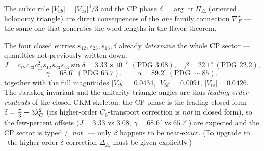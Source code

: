 \noindent The cubic rule $|V_{ub}|=|V_{us}|^3/3$ and the CP phase $\delta=\arg\operatorname{tr}\Pi_\triangle$
(oriented holonomy triangle) are direct consequences of the \emph{one} family connection
$\nabla_F^\star$ --- the same one that generates the word-lengths in the flavor theorem.

\begin{winbox}
The four closed entries $s_{12},s_{23},s_{13},\delta$ already \emph{determine} the whole CP sector ---
quantities not previously written down:
\[
  J=c_{12}c_{23}c_{13}^2 s_{12}s_{23}s_{13}\sin\delta=3.33\times10^{-5}\ (\text{PDG }3.08),\quad
  \beta=22.1^\circ\ (\text{PDG }22.2),
\]
\[
  \gamma=68.6^\circ\ (\text{PDG }65.7),\qquad \alpha=89.2^\circ\ (\text{PDG }\sim85),
\]
together with the full magnitudes $|V_{cb}|=0.0434$, $|V_{td}|=0.0091$, $|V_{ts}|=0.0426$. The Jarlskog
invariant and the unitarity-triangle angles are thus \emph{leading-order readouts} of the closed CKM
skeleton: the CP phase is the leading closed form $\delta=\tfrac\pi3+3\lambda_C^2$ (its higher-order $C_6$-transport
correction is \emph{not} in closed form), so the few-percent offsets ($J{=}3.33$ vs $3.08$, $\gamma{=}68.6^\circ$
vs $65.7^\circ$) are expected and the CP sector is typed \mE/\mC, \emph{not} \mE\ --- only $\beta$ happens to be
near-exact. (To upgrade to \mE\ the higher-order $\delta$ correction $\Delta_\triangle$ must be given
explicitly.)
\end{winbox}


